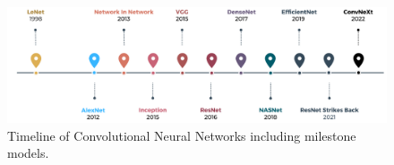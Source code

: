 \begin{figure}[H]
    \centering
    \includegraphics[width=\textwidth]{fig/rel/images/CNN_timeline.pdf}
    \caption{Timeline of Convolutional Neural Networks including milestone models.}
    \label{fig:cnn_timeline}
\end{figure}